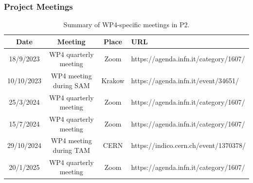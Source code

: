\subsubsection*{Project Meetings}
\begin{table}[H]
    \centering
    \caption{Summary of WP4-specific meetings in P2.}
    \begin{tabularx}{\textwidth}{|c|c|c|X|} \hline
        \rowcolor{mycyan}
        \textbf{Date} & \textbf{Meeting} & \textbf{Place} & \textbf{URL} \\ \hline
        18/9/2023 & WP4 quarterly meeting & Zoom & https://agenda.infn.it/category/1607/ \\ \hline         10/10/2023 & WP4 meeting during SAM & Krakow & https://agenda.infn.it/event/34651/ \\ \hline 
        25/3/2024 & WP4 quarterly meeting & Zoom & https://agenda.infn.it/category/1607/  \\ \hline        15/7/2024 & WP4 quarterly meeting & Zoom & https://agenda.infn.it/category/1607/ \\ \hline 
        29/10/2024 & WP4 meeting during TAM & CERN & https://indico.cern.ch/event/1370378/ \\ \hline 
        20/1/2025 & WP4 quarterly meeting & Zoom & https://agenda.infn.it/category/1607/ \\ \hline
     \end{tabularx}
    \label{tab:meetings}
\end{table}

